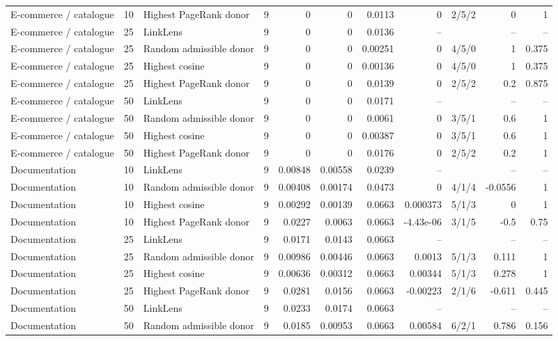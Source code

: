 \begin{table}[t]
{\begin{tabular}{lrlrrrrrlrr}
E-commerce / catalogue & 10 & Highest PageRank donor & 9 & 0 & 0 & 0.0113 & 0 & 2/5/2 & 0 & 1 \\
E-commerce / catalogue & 25 & LinkLens & 9 & 0 & 0 & 0.0136 & -- &  & -- & -- \\
E-commerce / catalogue & 25 & Random admissible donor & 9 & 0 & 0 & 0.00251 & 0 & 4/5/0 & 1 & 0.375 \\
E-commerce / catalogue & 25 & Highest cosine & 9 & 0 & 0 & 0.00136 & 0 & 4/5/0 & 1 & 0.375 \\
E-commerce / catalogue & 25 & Highest PageRank donor & 9 & 0 & 0 & 0.0139 & 0 & 2/5/2 & 0.2 & 0.875 \\
E-commerce / catalogue & 50 & LinkLens & 9 & 0 & 0 & 0.0171 & -- &  & -- & -- \\
E-commerce / catalogue & 50 & Random admissible donor & 9 & 0 & 0 & 0.0061 & 0 & 3/5/1 & 0.6 & 1 \\
E-commerce / catalogue & 50 & Highest cosine & 9 & 0 & 0 & 0.00387 & 0 & 3/5/1 & 0.6 & 1 \\
E-commerce / catalogue & 50 & Highest PageRank donor & 9 & 0 & 0 & 0.0176 & 0 & 2/5/2 & 0.2 & 1 \\
Documentation & 10 & LinkLens & 9 & 0.00848 & 0.00558 & 0.0239 & -- &  & -- & -- \\
Documentation & 10 & Random admissible donor & 9 & 0.00408 & 0.00174 & 0.0473 & 0 & 4/1/4 & -0.0556 & 1 \\
Documentation & 10 & Highest cosine & 9 & 0.00292 & 0.00139 & 0.0663 & 0.000373 & 5/1/3 & 0 & 1 \\
Documentation & 10 & Highest PageRank donor & 9 & 0.0227 & 0.0063 & 0.0663 & -4.43e-06 & 3/1/5 & -0.5 & 0.75 \\
Documentation & 25 & LinkLens & 9 & 0.0171 & 0.0143 & 0.0663 & -- &  & -- & -- \\
Documentation & 25 & Random admissible donor & 9 & 0.00986 & 0.00446 & 0.0663 & 0.0013 & 5/1/3 & 0.111 & 1 \\
Documentation & 25 & Highest cosine & 9 & 0.00636 & 0.00312 & 0.0663 & 0.00344 & 5/1/3 & 0.278 & 1 \\
Documentation & 25 & Highest PageRank donor & 9 & 0.0281 & 0.0156 & 0.0663 & -0.00223 & 2/1/6 & -0.611 & 0.445 \\
Documentation & 50 & LinkLens & 9 & 0.0233 & 0.0174 & 0.0663 & -- &  & -- & -- \\
Documentation & 50 & Random admissible donor & 9 & 0.0185 & 0.00953 & 0.0663 & 0.00584 & 6/2/1 & 0.786 & 0.156 \\

\end{tabular}}
\end{table}
